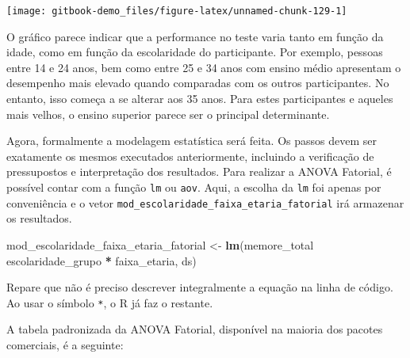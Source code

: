 \documentclass[
]{book}
\newenvironment{Shaded}{\begin{snugshade}}{\end{snugshade}}
\newcommand{\KeywordTok}[1]{\textcolor[rgb]{0.13,0.29,0.53}{\textbf{#1}}}
\newcommand{\NormalTok}[1]{#1}
\newcommand{\OperatorTok}[1]{\textcolor[rgb]{0.81,0.36,0.00}{\textbf{#1}}}
\newcommand{\StringTok}[1]{\textcolor[rgb]{0.31,0.60,0.02}{#1}}
\begin{document}
\begin{center}\texttt{[image: gitbook-demo\_files/figure-latex/unnamed-chunk-129-1]} \end{center}

O gráfico parece indicar que a performance no teste varia tanto em função da idade, como em função da escolaridade do participante. Por exemplo, pessoas entre 14 e 24 anos, bem como entre 25 e 34 anos com ensino médio apresentam o desempenho mais elevado quando comparadas com os outros participantes. No entanto, isso começa a se alterar aos 35 anos. Para estes participantes e aqueles mais velhos, o ensino superior parece ser o principal determinante.

Agora, formalmente a modelagem estatística será feita. Os passos devem ser exatamente os mesmos executados anteriormente, incluindo a verificação de pressupostos e interpretação dos resultados. Para realizar a ANOVA Fatorial, é possível contar com a função \texttt{lm} ou \texttt{aov}. Aqui, a escolha da \texttt{lm} foi apenas por conveniência e o vetor \texttt{mod\_escolaridade\_faixa\_etaria\_fatorial} irá armazenar os resultados.

\begin{Shaded}
\begin{Highlighting}[]
\NormalTok{mod_escolaridade_faixa_etaria_fatorial <-}\StringTok{ }\KeywordTok{lm}\NormalTok{(memore_total }\OperatorTok{~}\StringTok{ }\NormalTok{escolaridade_grupo }\OperatorTok{*}\StringTok{ }\NormalTok{faixa_etaria, ds)}
\end{Highlighting}
\end{Shaded}

Repare que não é preciso descrever integralmente a equação na linha de código. Ao usar o símbolo \texttt{*}, o R já faz o restante.

A tabela padronizada da ANOVA Fatorial, disponível na maioria dos pacotes comerciais, é a seguinte:
\end{document}
